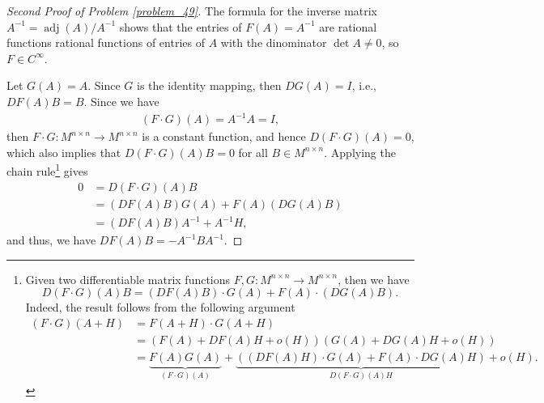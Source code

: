 \documentclass[11pt]{article}
\theoremstyle{definition}
\theoremstyle{definition}
\begin{document}
\begin{proof}[Second Proof of Problem \ref{problem_49}]
The formula for the inverse matrix $A^{-1} = \operatorname{adj}(A) / A^{-1}$ shows that the entries of $F(A) = A^{-1}$ are rational functions rational functions of entries of $A$ with the dinominator $\det A \neq 0$, so $F \in C^\infty$.

Let $G(A) = A$. Since $G$ is the identity mapping, then $DG(A) = I$, i.e., $DF(A)B = B$. Since we have
\begin{align*}
    (F \cdot G)(A) = A^{-1} A = I,
\end{align*}
then $F \cdot G: M^{n \times n} \to M^{n \times n}$ is a constant function, and hence $D(F \cdot G)(A) = 0$, which also implies that $D(F \cdot G)(A)B = 0$ for all $B \in M^{n \times n}$. Applying the chain rule\footnote{Given two differentiable matrix functions $F, G: M^{n \times n} \to M^{n \times n}$, then we have 
$$D(F\cdot G)(A)B = \left(DF(A)B \right)\cdot G(A) + F(A) \cdot \left(DG(A)B \right).$$
Indeed, the result follows from the following argument
\begin{align*}
    (F\cdot G)(A+H) & = F(A+H)\cdot G(A+H) \\
    & = \left(F(A) + DF(A)H + o(H)\right) \left(G(A) + DG(A)H + o(H)\right) \\
    & = \underbrace{F(A)G(A)}_{(F\cdot G)(A)} + \underbrace{\left( (DF(A)H)\cdot G(A) + F(A) \cdot DG(A)H  \right)}_{D(F\cdot G)(A)H} + o(H).
\end{align*}} gives
\begin{align*}
    0 & = D(F \cdot G)(A)B \\
    & = \left( DF(A)B \right) G(A) + F(A) \left( DG(A)B \right) \\
    & = \left( DF(A)B \right) A^{-1} + A^{-1} H,
\end{align*}
and thus, we have $DF(A)B = - A^{-1}BA^{-1}$.
\end{proof}
\end{document}
